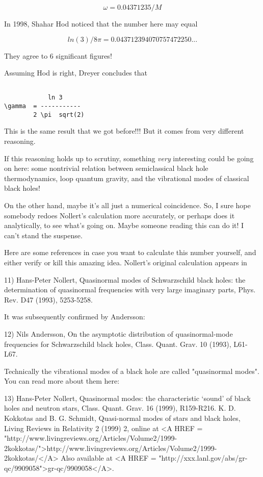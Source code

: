 $$

\omega  = 0.04371235 / M
$$
    
In 1998, Shahar Hod noticed that the number here may equal


$$

ln(3) / 8 \pi  = 0.043712394070757472250... 
$$
    
They agree to 6 significant figures!  

Assuming Hod is right, Dreyer concludes that
   

\begin{verbatim}

            ln 3
\gamma  = -----------
        2 \pi  sqrt(2)
\end{verbatim}
    
This is the same result that we got before!!!  But it comes from very
different reasoning.  

If this reasoning holds up to scrutiny, something \emph{very} interesting
could be going on here: some nontrivial relation between semiclassical
black hole thermodynamics, loop quantum gravity, and the vibrational
modes of classical black holes!

On the other hand, maybe it's all just a numerical coincidence.  So, 
I sure hope somebody redoes Nollert's calculation more accurately, or
perhaps does it analytically, to see what's going on.  Maybe someone
reading this can do it!  I can't stand the suspense.

Here are some references in case you want to calculate this number
yourself, and either verify or kill this amazing idea.  Nollert's
original calculation appears in

11) Hans-Peter Nollert, Quasinormal modes of Schwarzschild black
holes: the determination of quasinormal frequencies with very large
imaginary parts, Phys. Rev. D47 (1993), 5253-5258.

It was subsequently confirmed by Andersson:

12) Nils Andersson, On the asymptotic distribution of quasinormal-mode
frequencies for Schwarzschild black holes, Class. Quant. Grav. 10
(1993), L61-L67.  

Technically the vibrational modes of a black hole are called
"quasinormal modes".  You can read more about them here:

13) Hans-Peter Nollert, Quasinormal modes: the characteristic
`sound' of black holes and neutron stars, Class. Quant. Grav. 16
(1999), R159-R216.
K. D. Kokkotas and B. G. Schmidt, Quasi-normal modes of stars
and black holes, Living Reviews in Relativity 2 (1999) 2, 
online at <A HREF = "http://www.livingreviews.org/Articles/Volume2/1999-2kokkotas/">http://www.livingreviews.org/Articles/Volume2/1999-2kokkotas/</A>
Also available at <A HREF = "http://xxx.lanl.gov/abs/gr-qc/9909058">gr-qc/9909058</A>.

